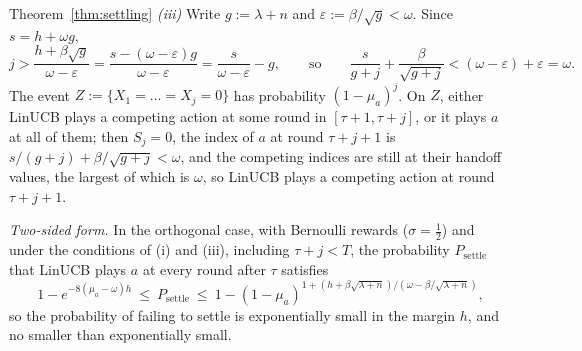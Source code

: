 \documentclass[anon]{alt2027} %
\begin{document}
\begin{proofof}{Theorem~\ref{thm:settling}}
\emph{(iii)} Write $g:=\lambda+n$ and $\varepsilon:=\beta/\sqrt g<\omega$. Since
$s=h+\omega g$,
\[
j>\frac{h+\beta\sqrt g}{\omega-\varepsilon}=\frac{s-(\omega-\varepsilon)g}{\omega-\varepsilon}
=\frac{s}{\omega-\varepsilon}-g,
\qquad\text{so}\qquad
\frac{s}{g+j}+\frac{\beta}{\sqrt{g+j}}<(\omega-\varepsilon)+\varepsilon=\omega .
\]
The event $Z:=\{X_1=\dots=X_j=0\}$ has probability $(1-\mu_a)^j$. On $Z$,
either LinUCB plays a competing action at some round in
$[\tau+1,\tau+j]$, or it plays $a$ at all of them; then $S_j=0$, the index of
$a$ at round $\tau+j+1$ is $s/(g+j)+\beta/\sqrt{g+j}<\omega$, and the competing
indices are still at their handoff values, the largest of which is $\omega$,
so LinUCB plays a competing action at round $\tau+j+1$.
\end{proofof}

\emph{Two-sided form.} In the orthogonal case, with Bernoulli rewards ($\sigma=\frac12$) and under the
conditions of (i) and (iii), including $\tau+j<T$, the probability $P_{\mathrm{settle}}$ that LinUCB
plays $a$ at every round after $\tau$ satisfies
\[
1-e^{-8(\mu_a-\omega)h}\ \le\ P_{\mathrm{settle}}\ \le\
1-(1-\mu_a)^{1+(h+\beta\sqrt{\lambda+n})/(\omega-\beta/\sqrt{\lambda+n})},
\]
so the probability of failing to settle is exponentially small in the margin
$h$, and no smaller than exponentially small.
\end{document}

